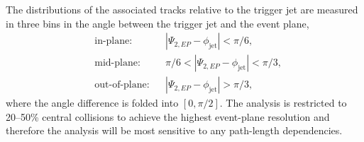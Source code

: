 The distributions of the associated tracks relative to the trigger jet are measured in three bins in the angle between the trigger jet and the event plane,
%
\begin{equation}
	\begin{aligned}
		&\text{in-plane:}     && |\Psi_{2,EP}-\phi_{\mathrm{jet}}|<\pi/6,\\
		&\text{mid-plane:}    && \pi/6<|\Psi_{2,EP}-\phi_{\mathrm{jet}}|<\pi/3,\\
		&\text{out-of-plane:} && |\Psi_{2,EP}-\phi_{\mathrm{jet}}|>\pi/3,
	\end{aligned}
	\label{Eq:EPbins}
\end{equation}
%
where the angle difference is folded into $[0, \pi/2]$.
%
The analysis is restricted to 20--50\% central \AuAu collisions to achieve the highest event-plane resolution and therefore the analysis will be most sensitive to any path-length dependencies. 


